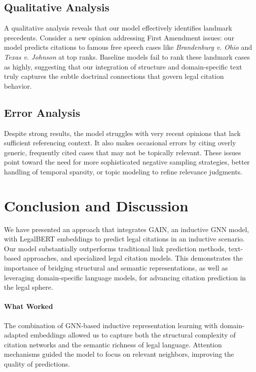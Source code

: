 \documentclass{article}
\begin{document}
\subsection{Qualitative Analysis}
A qualitative analysis reveals that our model effectively identifies landmark precedents. Consider a new opinion addressing First Amendment issues: our model predicts citations to famous free speech cases like \emph{Brandenburg v. Ohio} and \emph{Texas v. Johnson} at top ranks. Baseline models fail to rank these landmark cases as highly, suggesting that our integration of structure and domain-specific text truly captures the subtle doctrinal connections that govern legal citation behavior.

\subsection{Error Analysis}
Despite strong results, the model struggles with very recent opinions that lack sufficient referencing context. It also makes occasional errors by citing overly generic, frequently cited cases that may not be topically relevant. These issues point toward the need for more sophisticated negative sampling strategies, better handling of temporal sparsity, or topic modeling to refine relevance judgments.

\section{Conclusion and Discussion}
We have presented an approach that integrates GAIN, an inductive GNN model, with LegalBERT embeddings to predict legal citations in an inductive scenario. Our model substantially outperforms traditional link prediction methods, text-based approaches, and specialized legal citation models. This demonstrates the importance of bridging structural and semantic representations, as well as leveraging domain-specific language models, for advancing citation prediction in the legal sphere.

\paragraph{What Worked}
The combination of GNN-based inductive representation learning with domain-adapted embeddings allowed us to capture both the structural complexity of citation networks and the semantic richness of legal language. Attention mechanisms guided the model to focus on relevant neighbors, improving the quality of predictions.
\end{document}
